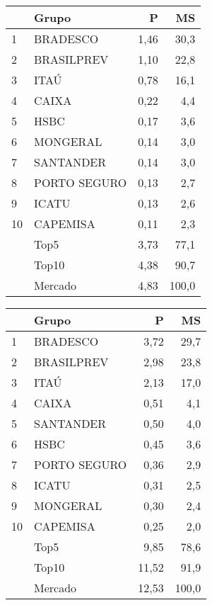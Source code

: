 \documentclass[../../relatorio.tex]{subfiles}
\begin{document}
\begin{table}[!h]
  \begin{minipage}[t]{0.49\linewidth}
    \centering
\begin{tabular}{llrr}
  \hline
 & Grupo & P & MS \\ 
  \hline
1 & BRADESCO & 1,46 & 30,3 \\ 
  2 & BRASILPREV & 1,10 & 22,8 \\ 
  3 & ITAÚ & 0,78 & 16,1 \\ 
  4 & CAIXA & 0,22 & 4,4 \\ 
  5 & HSBC & 0,17 & 3,6 \\ 
  6 & MONGERAL & 0,14 & 3,0 \\ 
  7 & SANTANDER & 0,14 & 3,0 \\ 
  8 & PORTO SEGURO & 0,13 & 2,7 \\ 
  9 & ICATU & 0,13 & 2,6 \\ 
  10 & CAPEMISA & 0,11 & 2,3 \\ 
   \hline
 & Top5 & 3,73 & 77,1 \\ 
   & Top10 & 4,38 & 90,7 \\ 
   & Mercado & 4,83 & 100,0 \\ 
   \hline
\end{tabular}    
  \end{minipage}
  \hspace{0.5cm}
  \begin{minipage}[t]{0.49\linewidth}
    \centering
\begin{tabular}{llrr}
  \hline
 & Grupo & P & MS \\ 
  \hline
1 & BRADESCO & 3,72 & 29,7 \\ 
  2 & BRASILPREV & 2,98 & 23,8 \\ 
  3 & ITAÚ & 2,13 & 17,0 \\ 
  4 & CAIXA & 0,51 & 4,1 \\ 
  5 & SANTANDER & 0,50 & 4,0 \\ 
  6 & HSBC & 0,45 & 3,6 \\ 
  7 & PORTO SEGURO & 0,36 & 2,9 \\ 
  8 & ICATU & 0,31 & 2,5 \\ 
  9 & MONGERAL & 0,30 & 2,4 \\ 
  10 & CAPEMISA & 0,25 & 2,0 \\ 
   \hline
 & Top5 & 9,85 & 78,6 \\ 
   & Top10 & 11,52 & 91,9 \\ 
   & Mercado & 12,53 & 100,0 \\ 
   \hline
\end{tabular}    
  \end{minipage}
\end{table}

\pagebreak
\end{document}
